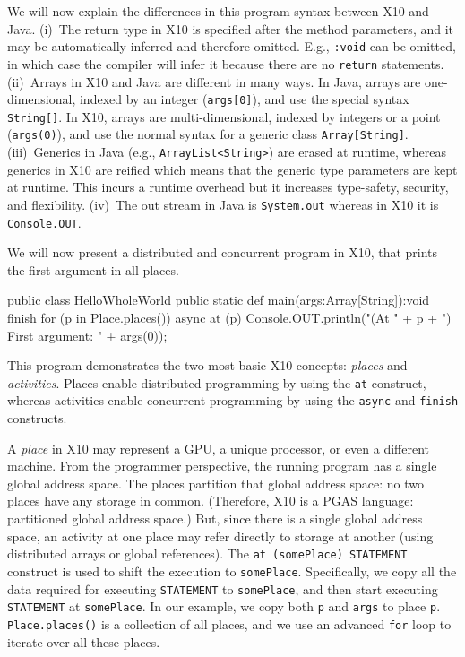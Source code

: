 \documentclass[a4paper]{article}
\def\codesmaller{\small}
\newcommand{\code}[1]{\texttt{\textup{\codesmaller #1}}}
\begin{document}
We will now explain the differences in this program syntax between X10 and Java.
(i)~The return type in X10 is specified after the method parameters, and it may be automatically inferred and therefore omitted.
E.g., \code{:void} can be omitted, in which case the compiler will infer it because there are no \code{return} statements.
(ii)~Arrays in X10 and Java are different in many ways.
In Java, arrays are one-dimensional, indexed by an integer (\code{args[0]}), and use the special syntax \code{String[]}.
In X10, arrays are multi-dimensional, indexed by integers or a point (\code{args(0)}), and use the normal syntax for a generic class \code{Array[String]}.
(iii)~Generics in Java (e.g., \code{ArrayList<String>}) are erased at runtime, whereas generics in X10 are reified which means
    that the generic type parameters are kept at runtime.
This incurs a runtime overhead but it increases type-safety, security, and flexibility.
(iv)~The out stream in Java is \code{System.out} whereas in X10 it is \code{Console.OUT}.

We will now present a distributed and concurrent program in X10,
    that prints the first argument in all places.

\begin{xten}
public class HelloWholeWorld {
  public static def main(args:Array[String]):void {
     finish
        for (p in Place.places())
          async
            at (p)
              Console.OUT.println("(At " + p + ") First argument: " + args(0));
  }
}
\end{xten}

This program demonstrates the two most basic X10 concepts: \emph{places} and \emph{activities}.
Places enable distributed programming by using the \code{at} construct,
    whereas activities enable concurrent programming by using the \code{async} and \code{finish} constructs.

A \emph{place} in X10 may represent a GPU, a unique processor, or even a different machine.
From the programmer perspective, the running program has a single global address space.
The places partition that global address space: no two places have any storage
in common. (Therefore, X10 is a PGAS language: partitioned global address space.)
But, since there is a single global address space, an activity at one place may
    refer directly to storage at another (using distributed arrays or global references).
The \code{at (somePlace) STATEMENT} construct is used to shift the execution to \code{somePlace}.
Specifically, we copy all the data required for executing \code{STATEMENT} to \code{somePlace},
    and then start executing \code{STATEMENT} at \code{somePlace}.
In our example, we copy both \code{p} and \code{args} to place \code{p}.
\code{Place.places()} is a collection of all places,
    and we use an advanced \code{for} loop to iterate over all these places.
\end{document}
